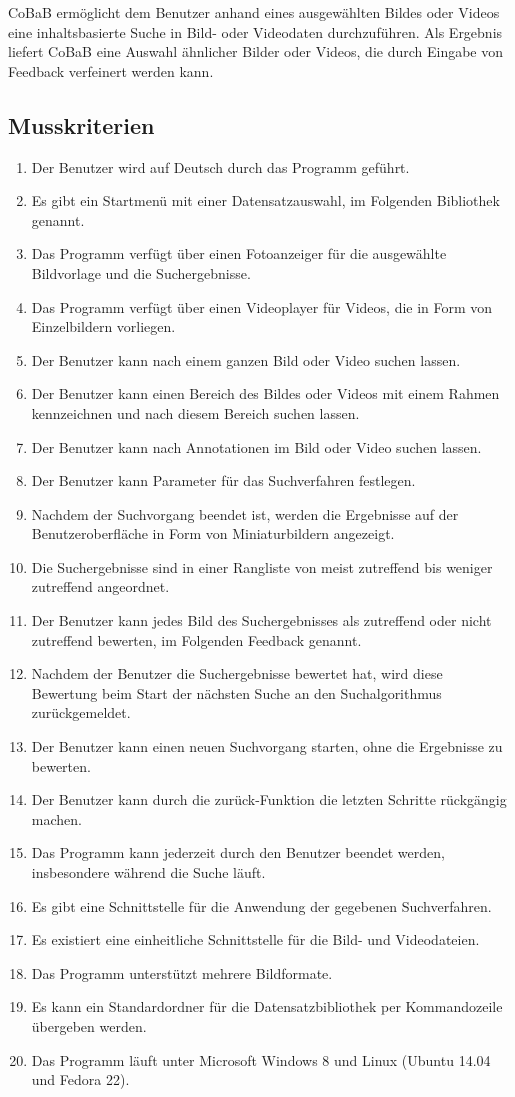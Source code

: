 CoBaB ermöglicht dem Benutzer anhand eines ausgewählten Bildes oder Videos eine inhaltsbasierte Suche in Bild- oder Videodaten durchzuführen. Als Ergebnis liefert CoBaB eine Auswahl ähnlicher Bilder oder Videos, die durch Eingabe von Feedback verfeinert werden kann.
\subsection{Musskriterien}
\begin{enumerate} [label=\bfseries /MK \arabic*0/, leftmargin=*]
\item Der Benutzer wird auf Deutsch durch das Programm geführt.
\item Es gibt ein Startmenü mit einer Datensatzauswahl, im Folgenden Bibliothek genannt.
\item Das Programm verfügt über einen Fotoanzeiger für die ausgewählte Bildvorlage und die Suchergebnisse.
\item Das Programm verfügt über einen Videoplayer für Videos, die in Form von Einzelbildern vorliegen.
\item Der Benutzer kann nach einem ganzen Bild oder Video suchen lassen.
\item Der Benutzer kann einen Bereich des Bildes oder Videos mit einem Rahmen kennzeichnen und nach diesem Bereich suchen lassen.
\item Der Benutzer kann nach Annotationen im Bild oder Video suchen lassen.
\item Der Benutzer kann Parameter für das Suchverfahren festlegen.
\item Nachdem der Suchvorgang beendet ist, werden die Ergebnisse auf der Benutzeroberfläche in Form von Miniaturbildern angezeigt.
\item Die Suchergebnisse sind in einer Rangliste von meist zutreffend bis weniger zutreffend angeordnet.
\item Der Benutzer kann jedes Bild des Suchergebnisses als zutreffend oder nicht zutreffend bewerten, im Folgenden Feedback genannt.
\item Nachdem der Benutzer die Suchergebnisse bewertet hat, wird diese Bewertung beim Start der nächsten Suche an den Suchalgorithmus zurückgemeldet.
\item Der Benutzer kann einen neuen Suchvorgang starten, ohne die Ergebnisse zu bewerten.
\item Der Benutzer kann durch die zurück-Funktion die letzten Schritte rückgängig machen.
\item Das Programm kann jederzeit durch den Benutzer beendet werden, insbesondere während die Suche läuft.
\item Es gibt eine Schnittstelle für die Anwendung der gegebenen Suchverfahren.
\item Es existiert eine einheitliche Schnittstelle für die Bild- und Videodateien.
\item Das Programm unterstützt mehrere Bildformate.
\item Es kann ein Standardordner für die Datensatzbibliothek per Kommandozeile übergeben werden.
\item Das Programm läuft unter Microsoft Windows 8 und Linux (Ubuntu 14.04 und Fedora 22).
\end{enumerate}
